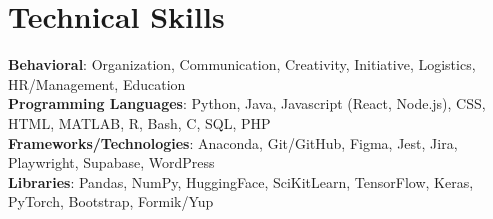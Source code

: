 \section{Technical Skills}
 \begin{itemize}[leftmargin=0.15in, label={}]
   \small{\item{
      \textbf{Behavioral}{: Organization, Communication, Creativity, Initiative, Logistics, HR/Management, Education} \\
      \textbf{Programming Languages}{: Python, Java, Javascript (React, Node.js), CSS, HTML, MATLAB, R, Bash, C, SQL, PHP} \\
      \textbf{Frameworks/Technologies}{: Anaconda, Git/GitHub, Figma, Jest, Jira, Playwright, Supabase, WordPress} \\
      \textbf{Libraries}{: Pandas, NumPy, HuggingFace, SciKitLearn, TensorFlow, Keras, PyTorch, Bootstrap, Formik/Yup}
    }}
 \end{itemize}